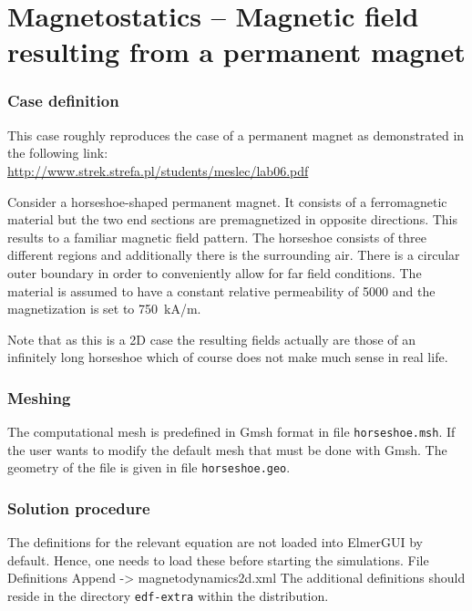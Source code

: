 \chapter{Magnetostatics -- Magnetic field resulting from a permanent magnet}




\subsection*{Case definition}

This case roughly reproduces the case of a permanent magnet as demonstrated in 
the following link: \\
\url{http://www.strek.strefa.pl/students/meslec/lab06.pdf}

Consider a horseshoe-shaped permanent magnet. It consists of a ferromagnetic material but the two end 
sections are premagnetized in opposite directions. This results to a familiar magnetic field pattern.
The horseshoe consists of three different regions and additionally there is the surrounding air.
There is a circular outer boundary in order to conveniently allow for far field conditions.  
The material is assumed to have a constant relative permeability of 5000 and the magnetization is 
set to 750~kA/m. 

Note that as this is a 2D case the resulting fields actually are those of an infinitely long 
horseshoe which of course does not make much sense in real life. 


\subsection*{Meshing}

The computational mesh is predefined in Gmsh format in file \texttt{horseshoe.msh}. 
If the user wants to modify the default mesh that must be done with Gmsh. The geometry of 
the file is given in file \texttt{horseshoe.geo}.


\subsection*{Solution procedure}

The definitions for the relevant equation are not loaded into ElmerGUI by default. Hence, 
one needs to load these before starting the simulations.
\ttbegin
File 
  Definitions
    Append -> magnetodynamics2d.xml
\ttend
The additional definitions should reside in the directory \texttt{edf-extra} within the distribution.\\

